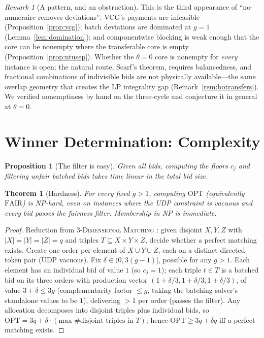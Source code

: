 \documentclass[11pt]{article}
\newtheorem{theorem}{Theorem}
\newtheorem{proposition}{Proposition}
\theoremstyle{remark}
\newtheorem{remark}{Remark}
\newcommand{\OPT}{\mathrm{OPT}}
\newcommand{\FAIR}{\mathrm{FAIR}}
\begin{document}
\begin{remark}[A pattern, and an obstruction]\label{rem:removesdev}
This is the third appearance of ``no-numeraire removes deviations'':
VCG's payments are infeasible (Proposition~\ref{prop:vcg}); batch
deviations are dominated at $g=1$ (Lemma~\ref{lem:domination}); and
componentwise blocking is weak enough that the core can be nonempty where
the transferable core is empty (Proposition~\ref{prop:ntusep}). Whether
the $\theta=0$ core is nonempty for \emph{every} instance is open; the
natural route, Scarf's theorem, requires balancedness, and fractional
combinations of indivisible bids are not physically available---the same
overlap geometry that creates the LP integrality gap
(Remark~\ref{rem:botransfers}). We verified nonemptiness by hand on the
three-cycle and conjecture it in general at $\theta=0$.
\end{remark}

\section{Winner Determination: Complexity}\label{sec:complexity}

\begin{proposition}[The filter is easy]\label{prop:filter}
Given all bids, computing the floors $c_j$ and filtering unfair batched bids
takes time linear in the total bid size.
\end{proposition}

\begin{theorem}[Hardness]\label{thm:nphard}
For every fixed $g>1$, computing $\OPT$ (equivalently $\FAIR$) is NP-hard,
even on instances where the UDP constraint is vacuous and every bid passes
the fairness filter. Membership in NP is immediate.
\end{theorem}

\begin{proof}
Reduction from \textsc{3-Dimensional Matching} \cite{karp1972}: given
disjoint $X,Y,Z$ with $|X|=|Y|=|Z|=q$ and triples $T\subseteq X\times
Y\times Z$, decide whether a perfect matching exists. Create one order per
element of $X\cup Y\cup Z$, each on a distinct directed token pair (UDP
vacuous). Fix $\delta\in(0,3(g-1)]$, possible for any $g>1$. Each element
has an individual bid of value $1$ (so $c_j=1$); each triple $t\in T$ is a
batched bid on its three orders with production vector
$(1+\delta/3,1+\delta/3,1+\delta/3)$, of value $3+\delta\le 3g$
(complementarity factor $\le g$, taking the batching solver's standalone
values to be $1$), delivering $>1$ per order (passes the filter). Any
allocation decomposes into disjoint triples plus individual bids, so
$\OPT=3q+\delta\cdot(\text{max \# disjoint triples in }T)$; hence
$\OPT\ge 3q+\delta q$ iff a perfect matching exists.
\end{proof}
\end{document}
